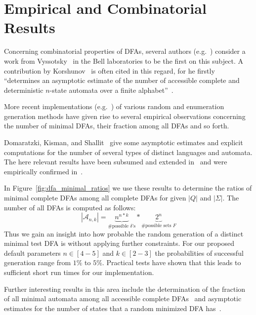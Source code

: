 \section{Empirical and Combinatorial Results}

Concerning combinatorial properties of DFAs, several authors (e.g.~\cite{BN07, DKS02, HJ14}) consider a work from Vyssotsky~\cite{Vys59} in the Bell laboratories to be the first on this subject. A contribution by Korshunov~\cite{Kor78} is often cited in this regard, for he firstly ``determines an asymptotic estimate of the number of accessible complete and deterministic $n$-state automata over a finite alphabet''~\cite{BDS11}.

More recent implementations (e.g.~\cite{AAA09, BDN07}) of various random and enumeration generation methods have given rise to several empirical observations concerning the number of minimal DFAs, their fraction among all DFAs and so forth.

Domaratzki, Kisman, and Shallit~\cite{DKS02} give some asymptotic estimates and explicit computations for the number of several types of distinct languages and automata. The here relevant results have been subsumed and extended in~\cite[p. 8]{AMR09} and were empirically confirmed in~\cite{BDN07}.

In Figure~\ref{fig:dfa_minimal_ratios} we use these results to determine the ratios of minimal complete DFAs among all complete DFAs for given $|Q|$ and $|\Sigma|$. The number of all DFAs is computed as follows:
\[
|\mathcal{A}_{n,k}| = \underbrace{n^{n*k}}_{\#\text{possible }\delta\text{'s}} * \underbrace{2^n}_{\#\text{possible sets }F}
\]
Thus we gain an insight into how probable the random generation of a distinct minimal test DFA is without applying further constraints. For our proposed default parameters $n\in[4-5]$ and $k\in[2-3]$ the probabilities of successful generation range from $1\%$ to $5\%$. Practical tests have shown that this leads to sufficient short run times for our implementation.

Further interesting results in this area include the determination of the fraction of all minimal automata among all accessible complete DFAs~\cite{BDS11} and asymptotic estimates for the number of states that a random minimized DFA has~\cite{BK13}.

